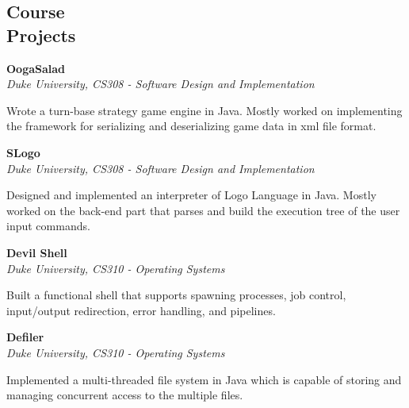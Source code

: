 \documentclass[11pt,margin,line]{cv}
\begin{document}
\begin{resume}
    \section{\mysidestyle Course\\Projects}
    \textbf{\textbf{OogaSalad}}\\
    \textsl{Duke University, CS308 - Software Design and Implementation}
    \begin{list3}
        \item Wrote a turn-base strategy game engine in Java. Mostly worked on implementing the framework for serializing and deserializing game data in xml file format.
    \end{list3}
    \textbf{\textbf{SLogo}}\\
    \textsl{Duke University, CS308 - Software Design and Implementation}
    \begin{list3}
        \item Designed and implemented an interpreter of Logo Language in Java. Mostly worked on the back-end part that parses and build the execution tree of the user input commands.
    \end{list3}
    \textbf{\textbf{Devil Shell}}\\
    \textsl{Duke University, CS310 - Operating Systems}
    \begin{list3}
        \item Built a functional shell that supports spawning processes, job control, input/output redirection, error handling, and pipelines.
    \end{list3}
    \textbf{\textbf{Defiler}}\\
    \textsl{Duke University, CS310 - Operating Systems}
    \begin{list3}
        \item Implemented a multi-threaded file system in Java which is capable of storing and managing concurrent access to the multiple files.
    \end{list3}

\end{resume}
\end{document}
